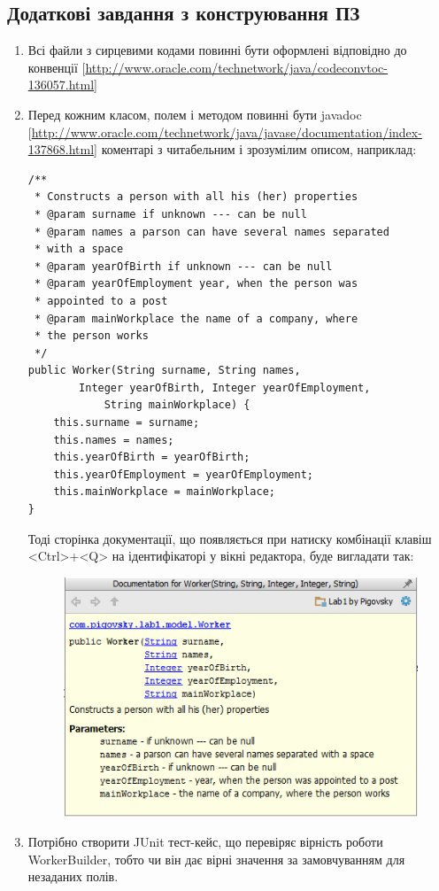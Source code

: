 \subsection{Додаткові завдання з конструювання ПЗ}
\begin{enumerate}
\item Всі файли з сирцевими кодами повинні бути оформлені відповідно до конвенції [\url{http://www.oracle.com/technetwork/java/codeconvtoc-136057.html}]
\item Перед кожним класом, полем і методом повинні бути javadoc [\url{http://www.oracle.com/technetwork/java/javase/documentation/index-137868.html}] коментарі з читабельним і зрозумілим описом, наприклад:
\begin{lstlisting}
/**
 * Constructs a person with all his (her) properties
 * @param surname if unknown --- can be null
 * @param names a parson can have several names separated 
 * with a space
 * @param yearOfBirth if unknown --- can be null
 * @param yearOfEmployment year, when the person was
 * appointed to a post
 * @param mainWorkplace the name of a company, where 
 * the person works
 */
public Worker(String surname, String names, 
        Integer yearOfBirth, Integer yearOfEmployment, 
            String mainWorkplace) {
    this.surname = surname;
    this.names = names;
    this.yearOfBirth = yearOfBirth;
    this.yearOfEmployment = yearOfEmployment;
    this.mainWorkplace = mainWorkplace;
}
\end{lstlisting}
Тоді сторінка документації, що появляється при натиску комбінації клавіш <Ctrl>+<Q> на ідентифікаторі у вікні редактора, буде вигладати так:
\begin{figure}[H]
\centering
\includegraphics{JavadocExample}
\end{figure}

\item Потрібно створити JUnit тест-кейс, що перевіряє вірність роботи WorkerBuilder, тобто чи він дає вірні значення за замовчуванням для незаданих полів.
\end{enumerate}

